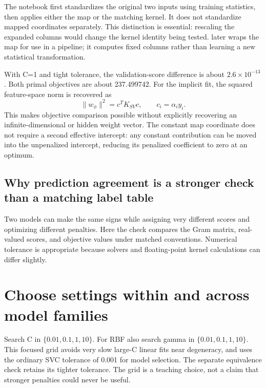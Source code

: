 The notebook first standardizes the original two inputs using training statistics, then applies either the map
or the matching kernel. It does not standardize mapped coordinates separately. This distinction is essential:
rescaling the expanded columns would change the kernel identity being tested.
 later wraps the map for use in a pipeline; it computes fixed columns rather than
learning a new statistical transformation.

With C=1 and tight tolerance, the validation-score difference is about $2.6\times10^{-13}$.
Both primal objectives are about 237.499742. For the implicit fit, the squared feature-space norm is recovered as
\[\|w_\phi\|^2=c^TK_{SV}c,\qquad c_i=\alpha_i y_i.\]
This makes objective comparison possible without explicitly recovering an infinite-dimensional or hidden weight vector.
The constant map coordinate does not require a second effective intercept: any constant contribution can be
moved into the unpenalized intercept, reducing its penalized coefficient to zero at an optimum.

\subsection*{Why prediction agreement is a stronger check than a matching label table}
Two models can make the same signs while assigning very different scores and optimizing different penalties.
Here the check compares the Gram matrix, real-valued scores, and objective values under matched conventions.
Numerical tolerance is appropriate because solvers and floating-point kernel calculations can differ slightly.

\section{Choose settings within and across model families}
Search C in $\{0.01,0.1,1,10\}$. For RBF also search gamma in $\{0.01,0.1,1,10\}$.
This focused grid avoids very slow large-C linear fits near degeneracy, and uses the ordinary SVC tolerance of 0.001
for model selection. The separate equivalence check retains its tighter tolerance.
The grid is a teaching choice, not a claim that stronger penalties could never be useful.

